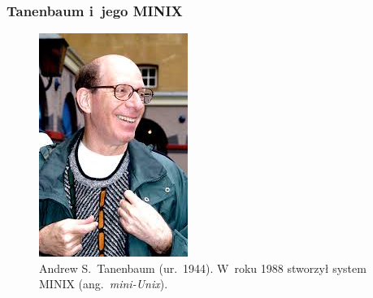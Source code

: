 \documentclass[10pt,t]{beamer}
\begin{document}
\begin{frame}
  \frametitle{Tanenbaum i~jego MINIX}


  \begin{figure}

    \centering


    \includegraphics[scale=0.65]
    {./PresentationsPictures/OS-heroes-Pictures/Andrew-S-Tanenbaum.jpeg}

    \caption{Andrew S.~Tanenbaum (ur.~1944). W~roku 1988 stworzył system
      MINIX (ang.~\textit{mini-Unix}).}

    \label{fig:Andrew-S-Tanenbaum}

  \end{figure}

\end{frame}
\end{document}
